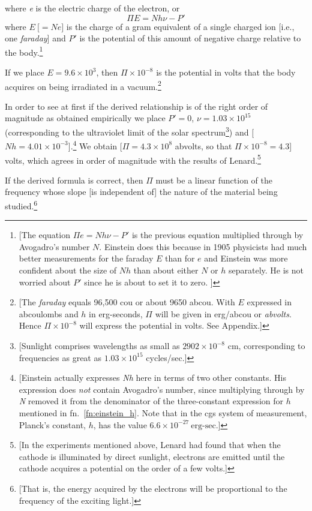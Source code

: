 %
where \emph{e} is the electric charge of the electron, or
%
\begin{equation*}
\Pi E = Nh\nu - P'
\end{equation*}
%
where $E \: \text{[}\!= Ne\text{]}$ is the charge of a gram equivalent of a
single charged ion {[}i.e., one \emph{faraday}{]} and $P'$ is the
potential of this amount of negative charge relative to the
body.\footnote{{[}The equation $\Pi e = Nh\nu - P'$ is the
  previous equation multiplied through by Avogadro's number $N$.
  Einstein does this because in 1905 physicists had much better
  measurements for the faraday $E$ than for $e$ and Einstein
  was more confident about the size of $Nh$ than about either
  $N$ or $h$ separately. He is not worried about $P'$
  since he is about to set it to zero. {]}}

If we place $E = 9.6\times 10^3$, then $\Pi\times 10^{-8}$ is the potential
in volts that the body acquires on being irradiated in a
vacuum.\footnote{{[}The \emph{faraday} equals 96,500 cou or about 9650
  abcou. With $E$ expressed in abcoulombs and $h$ in
  erg-seconds, $\Pi$ will be given in erg/abcou or \emph{abvolts}.
  Hence $\Pi\times 10^{-8}$ will express the potential in volts. See
  Appendix.{]}}

In order to see at first if the derived relationship is of the right
order of magnitude as obtained empirically we place $P' = 0$,
$\nu = 1.03\times 10^{15}$ (corresponding to the ultraviolet limit of the
solar spectrum\footnote{{[}Sunlight comprises wavelengths as small as
  $2902\times 10^{-8}$ cm, corresponding to frequencies as great as $1.03\times 10^{15}$
  cycles/sec.{]}}) and {[}$Nh = 4.01\times 10^{-3}${]}.\footnote{{[}Einstein
  actually expresses \emph{Nh} here in terms of two other constants. His
  expression does \emph{not} contain Avogadro's number, since
  multiplying through by \emph{N} removed it from the denominator of the
  three-constant expression for $h$ mentioned in fn.\ \ref{fn:einstein_h}. 
  Note that in the cgs system of 
  measurement, Planck’s constant, $h$, has the value $6.6\times 10^{-27}\ \text{erg-sec}$.{]}} We
obtain {[}$\Pi = 4.3\times 10^8$ abvolts, so that $\Pi\times 10^{-8} =
4.3${]} volts, which agrees in order of magnitude with the results of
Lenard.\footnote{{[}In the experiments mentioned above, Lenard
  had found that when the cathode is illuminated by direct sunlight,
  electrons are emitted until the cathode acquires a potential on the
  order of a few volts.{]}}

If the derived formula is correct, then $\Pi$ must be a linear
function of the frequency whose slope {[}is independent of{]} the nature
of the material being studied.\footnote{{[}That is, the energy acquired
  by the electrons will be proportional to the frequency of the exciting
  light.{]}}

